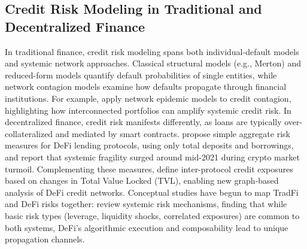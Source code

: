 
\subsection{Credit Risk Modeling in Traditional and Decentralized Finance}
In traditional finance, credit risk modeling spans both individual-default models and systemic network approaches.  Classical structural models (e.g., Merton) and reduced-form models quantify default probabilities of single entities, while network contagion models examine how defaults propagate through financial institutions.  For example, \cite{Dolfin2019} apply network epidemic models to credit contagion, highlighting how interconnected portfolios can amplify systemic credit risk.  
In decentralized finance, credit risk manifests differently, as loans are typically over-collateralized and mediated by smart contracts.  \cite{Bertomeu2024} propose simple aggregate risk measures for DeFi lending protocols, using only total deposits and borrowings, and report that systemic fragility surged around mid-2021 during crypto market turmoil.  Complementing these measures, \cite{wu2025} define inter-protocol credit exposures based on changes in Total Value Locked (TVL), enabling new graph-based analysis of DeFi credit networks.  Conceptual studies have begun to map TradFi and DeFi risks together: \cite{Aufiero2025} review systemic risk mechanisms, finding that while basic risk types (leverage, liquidity shocks, correlated exposures) are common to both systems, DeFi's algorithmic execution and composability lead to unique propagation channels.

